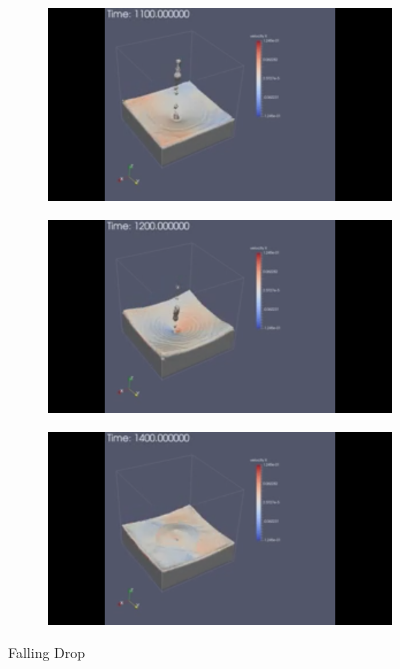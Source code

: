 \documentclass[10pt,a4paper,notitlepage]{article}
\begin{document}
\begin{figure}[H]
\begin{subfigure}{0.25\textwidth}
\end{subfigure}
\centering
\begin{subfigure}{0.25\textwidth}
  \includegraphics[width=1.0\linewidth]{drop/7.png}
\end{subfigure}%
\begin{subfigure}{0.25\textwidth}
  \includegraphics[width=1.0\linewidth]{drop/8.png}
\end{subfigure}
\begin{subfigure}{0.25\textwidth}
  \includegraphics[width=1.0\linewidth]{drop/9.png}
\end{subfigure}
\caption{Falling Drop}
\label{fig:drop}
\end{figure}



\end{document}
